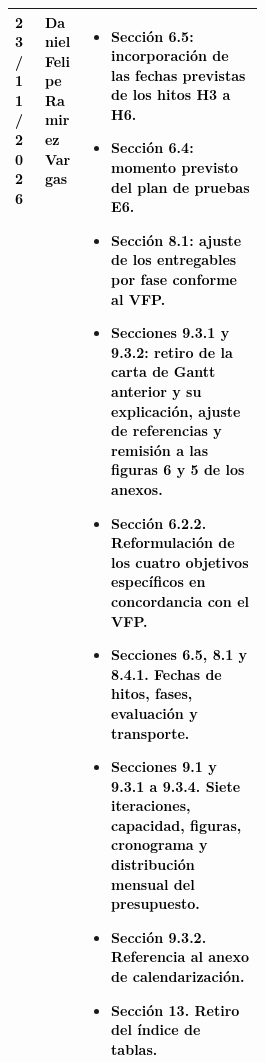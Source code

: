 \begin{longtable}{|p{0.12\linewidth}|p{0.17\linewidth}|p{}|}
\textcolor{black}{23/11/2026} & \textcolor{black}{Daniel Felipe Ramirez Vargas} & \vspace{-\baselineskip}\begin{itemize}\setlength{\itemsep}{0pt}\setlength{\parskip}{0pt}\setlength{\topsep}{0pt} \item \textcolor{black}{Sección 6.5: incorporación de las fechas previstas de los hitos H3 a H6.} \item \textcolor{black}{Sección 6.4: momento previsto del plan de pruebas E6.} \item \textcolor{black}{Sección 8.1: ajuste de los entregables por fase conforme al VFP.} \item \textcolor{black}{Secciones 9.3.1 y 9.3.2: retiro de la carta de Gantt anterior y su explicación, ajuste de referencias y remisión a las figuras 6 y 5 de los anexos.} \item \textcolor{black}{Sección 6.2.2. Reformulación de los cuatro objetivos específicos en concordancia con el VFP.} \item \textcolor{black}{Secciones 6.5, 8.1 y 8.4.1. Fechas de hitos, fases, evaluación y transporte.} \item \textcolor{black}{Secciones 9.1 y 9.3.1 a 9.3.4. Siete iteraciones, capacidad, figuras, cronograma y distribución mensual del presupuesto.} \item \textcolor{black}{Sección 9.3.2. Referencia al anexo de calendarización.} \item \textcolor{black}{Sección 13. Retiro del índice de tablas.}\end{itemize}\\\hline


\end{longtable}
